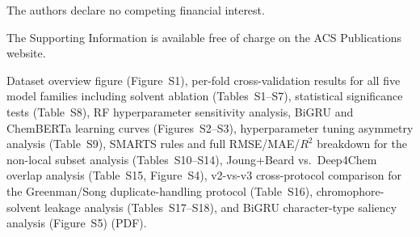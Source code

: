 \documentclass[journal=jcisd8,manuscript=article]{achemso}
\begin{document}
The authors declare no competing financial interest.

\begin{suppinfo}
The Supporting Information is available free of charge on the ACS Publications website.

Dataset overview figure (Figure~S1), per-fold cross-validation results for all five model families including solvent ablation (Tables~S1--S7), statistical significance tests (Table~S8), RF hyperparameter sensitivity analysis, BiGRU and ChemBERTa learning curves (Figures~S2--S3), hyperparameter tuning asymmetry analysis (Table~S9), SMARTS rules and full RMSE/MAE/$R^2$ breakdown for the non-local subset analysis (Tables~S10--S14), Joung+Beard vs.\ Deep4Chem overlap analysis (Table~S15, Figure~S4), v2-vs-v3 cross-protocol comparison for the Greenman/Song duplicate-handling protocol (Table~S16), chromophore-solvent leakage analysis (Tables~S17--S18), and BiGRU character-type saliency analysis (Figure~S5) (PDF).
\end{suppinfo}


\end{document}
